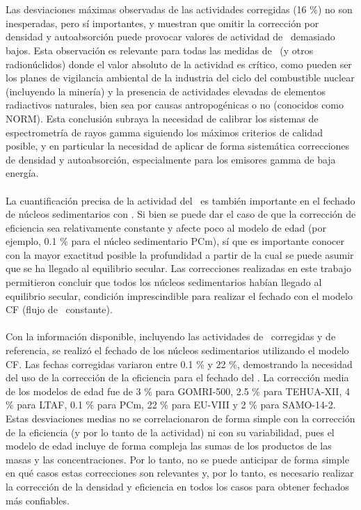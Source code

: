 \\
\\
Las desviaciones máximas observadas de las actividades corregidas (16 \%) no son inesperadas, pero sí importantes, y muestran que omitir la corrección por densidad y autoabsorción puede provocar valores de actividad de \PbCero\, demasiado bajos. Esta observación es relevante para todas las medidas de \PbCero\, (y otros radionúclidos) donde el valor absoluto de la actividad es crítico, como pueden ser los planes de vigilancia ambiental de la industria del ciclo del combustible nuclear (incluyendo la minería) y la presencia de actividades elevadas de elementos radiactivos naturales, bien sea por causas antropogénicas o no (conocidos como NORM). Esta conclusión subraya la necesidad de calibrar los sistemas de espectrometría de rayos gamma siguiendo los máximos criterios de calidad posible, y en particular la necesidad de aplicar de forma sistemática correcciones de densidad y autoabsorción, especialmente para los emisores gamma de baja energía. 
\\
\\
La cuantificación precisa de la actividad del \PbCero\, es también importante en el fechado de núcleos sedimentarios con \PbCero. Si bien se puede dar el caso de que la corrección de eficiencia sea relativamente constante y afecte poco al modelo de edad (por ejemplo, 0.1 \% para el núcleo sedimentario PCm), sí que es importante conocer con la mayor exactitud posible la profundidad a partir de la cual se puede asumir que se ha llegado al equilibrio secular. Las correcciones realizadas en este trabajo permitieron concluir que todos los núcleos sedimentarios habían llegado al equilibrio secular, condición imprescindible para realizar el fechado con el modelo CF (flujo de \PbCeroEx\, constante). 
\\
\\
Con la información disponible, incluyendo las actividades de \PbCero\, corregidas y de referencia, se realizó el fechado de los núcleos sedimentarios utilizando el modelo CF. Las fechas corregidas variaron entre 0.1 \% y 22 \%, demostrando la necesidad del uso de la corrección de la eficiencia para el fechado del \PbCero. La corrección media de los modelos de edad fue de 3 \% para GOMRI-500, 2.5 \% para TEHUA-XII, 4 \% para LTAF, 0.1 \% para PCm, 22 \% para EU-VIII y 2 \% para SAMO-14-2. Estas desviaciones medias no se correlacionaron de forma simple con la corrección de la eficiencia (y por lo tanto de la actividad) ni con su variabilidad, pues el modelo de edad incluye de forma compleja las sumas de los productos de las masas y las concentraciones. Por lo tanto, no se puede anticipar de forma simple en qué casos estas correcciones son relevantes y, por lo tanto, es necesario realizar la corrección de la densidad y eficiencia en todos los casos para obtener fechados más confiables.